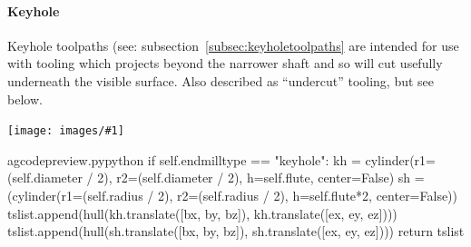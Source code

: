 \documentclass{ltxdoc}
\newcommand{\includeimage}[1]{\bigskip\noindent\texttt{[image: images/\#1]}\bigskip}
\begin{document}
\paragraph{Keyhole}

Keyhole toolpaths (see: subsection~\ref{subsec:keyholetoolpaths} are intended for use with tooling which projects beyond the narrower shaft and so will cut usefully underneath the visible surface. Also described as ``undercut'' tooling, but see below.

\includeimage{keyhole_router_bits.pdf}%

%
%
%

\lstset{firstnumber=\thegcpy}
\begin{writecode}{a}{gcodepreview.py}{python}
        if self.endmilltype == "keyhole":
            kh = cylinder(r1=(self.diameter / 2), r2=(self.diameter / 2), h=self.flute, center=False)
            sh = (cylinder(r1=(self.radius / 2), r2=(self.radius / 2), h=self.flute*2, center=False))
            tslist.append(hull(kh.translate([bx, by, bz]), kh.translate([ex, ey, ez])))
            tslist.append(hull(sh.translate([bx, by, bz]), sh.translate([ex, ey, ez])))
            return tslist

\end{writecode}
\addtocounter{gcpy}{23}

%
%
%
%
\end{document}
